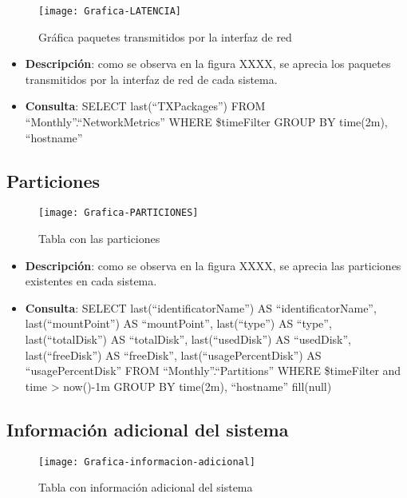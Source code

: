 \documentclass[ spanish, a4paper, 12pt, oneside]{report}
\begin{document}
\begin{figure}[!h]
   \centering
   \texttt{[image: Grafica-LATENCIA]}\\
      \caption{\label{fig: Gráfica paquetes transmitidos por la interfaz de red} Gráfica paquetes transmitidos por la interfaz de red}
\end{figure}

\begin{itemize}
   \item \textbf{Descripción}: como se observa en la figura XXXX, se aprecia los paquetes transmitidos por la interfaz de red de cada sistema.
   \item \textbf{Consulta}: SELECT last(``TXPackages'') FROM ``Monthly''.``NetworkMetrics'' WHERE \$timeFilter GROUP BY time(2m), ``hostname''
\end{itemize}

\subsection{Particiones}

\begin{figure}[!h]
   \centering
   \texttt{[image: Grafica-PARTICIONES]}\\
      \caption{\label{fig: Tabla con las particiones} Tabla con las particiones}
\end{figure}

\begin{itemize}
   \item \textbf{Descripción}: como se observa en la figura XXXX, se aprecia las particiones existentes en cada sistema.
   \item \textbf{Consulta}: SELECT last(``identificatorName'') AS ``identificatorName'', last(``mountPoint'') AS ``mountPoint'', last(``type'') AS ``type'', last(``totalDisk'') AS ``totalDisk'', last(``usedDisk'') AS ``usedDisk'', last(``freeDisk'') AS ``freeDisk'', last(``usagePercentDisk'') AS ``usagePercentDisk'' FROM ``Monthly''.``Partitions'' WHERE \$timeFilter and time > now()-1m GROUP BY time(2m), ``hostname'' fill(null)
\end{itemize}

\subsection{Información adicional del sistema}

\begin{figure}[!h]
   \centering
   \texttt{[image: Grafica-informacion-adicional]}\\
      \caption{\label{fig: Tabla con información adicional del sistema } Tabla con información adicional del sistema}
\end{figure}
\end{document}
